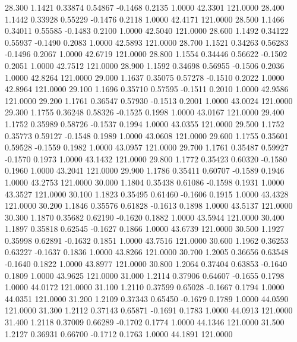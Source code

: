   28.300   1.1421   0.33874   0.54867  -0.1468   0.2135   1.0000  42.3301 121.0000
  28.400   1.1442   0.33928   0.55229  -0.1476   0.2118   1.0000  42.4171 121.0000
  28.500   1.1466   0.34011   0.55585  -0.1483   0.2100   1.0000  42.5040 121.0000
  28.600   1.1492   0.34122   0.55937  -0.1490   0.2083   1.0000  42.5893 121.0000
  28.700   1.1521   0.34263   0.56283  -0.1496   0.2067   1.0000  42.6719 121.0000
  28.800   1.1554   0.34446   0.56622  -0.1502   0.2051   1.0000  42.7512 121.0000
  28.900   1.1592   0.34698   0.56955  -0.1506   0.2036   1.0000  42.8264 121.0000
  29.000   1.1637   0.35075   0.57278  -0.1510   0.2022   1.0000  42.8964 121.0000
  29.100   1.1696   0.35710   0.57595  -0.1511   0.2010   1.0000  42.9586 121.0000
  29.200   1.1761   0.36547   0.57930  -0.1513   0.2001   1.0000  43.0024 121.0000
  29.300   1.1755   0.36248   0.58326  -0.1525   0.1998   1.0000  43.0167 121.0000
  29.400   1.1752   0.35989   0.58726  -0.1537   0.1994   1.0000  43.0355 121.0000
  29.500   1.1752   0.35773   0.59127  -0.1548   0.1989   1.0000  43.0608 121.0000
  29.600   1.1755   0.35601   0.59528  -0.1559   0.1982   1.0000  43.0957 121.0000
  29.700   1.1761   0.35487   0.59927  -0.1570   0.1973   1.0000  43.1432 121.0000
  29.800   1.1772   0.35423   0.60320  -0.1580   0.1960   1.0000  43.2041 121.0000
  29.900   1.1786   0.35411   0.60707  -0.1589   0.1946   1.0000  43.2753 121.0000
  30.000   1.1804   0.35438   0.61086  -0.1598   0.1931   1.0000  43.3527 121.0000
  30.100   1.1823   0.35495   0.61460  -0.1606   0.1915   1.0000  43.4328 121.0000
  30.200   1.1846   0.35576   0.61828  -0.1613   0.1898   1.0000  43.5137 121.0000
  30.300   1.1870   0.35682   0.62190  -0.1620   0.1882   1.0000  43.5944 121.0000
  30.400   1.1897   0.35818   0.62545  -0.1627   0.1866   1.0000  43.6739 121.0000
  30.500   1.1927   0.35998   0.62891  -0.1632   0.1851   1.0000  43.7516 121.0000
  30.600   1.1962   0.36253   0.63227  -0.1637   0.1836   1.0000  43.8266 121.0000
  30.700   1.2005   0.36656   0.63548  -0.1640   0.1822   1.0000  43.8977 121.0000
  30.800   1.2064   0.37404   0.63853  -0.1640   0.1809   1.0000  43.9625 121.0000
  31.000   1.2114   0.37906   0.64607  -0.1655   0.1798   1.0000  44.0172 121.0000
  31.100   1.2110   0.37599   0.65028  -0.1667   0.1794   1.0000  44.0351 121.0000
  31.200   1.2109   0.37343   0.65450  -0.1679   0.1789   1.0000  44.0590 121.0000
  31.300   1.2112   0.37143   0.65871  -0.1691   0.1783   1.0000  44.0913 121.0000
  31.400   1.2118   0.37009   0.66289  -0.1702   0.1774   1.0000  44.1346 121.0000
  31.500   1.2127   0.36931   0.66700  -0.1712   0.1763   1.0000  44.1891 121.0000
